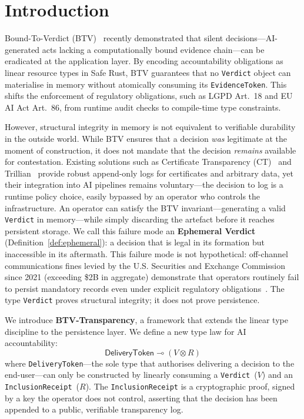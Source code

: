 \section{Introduction}
\label{sec:intro}

Bound-To-Verdict (BTV)~\cite{btv2026} recently demonstrated that silent
decisions---AI-generated acts lacking a computationally bound evidence
chain---can be eradicated at the application layer. By encoding accountability
obligations as linear resource types in Safe Rust, BTV guarantees that no
\texttt{Verdict} object can materialise in memory without atomically consuming
its \texttt{EvidenceToken}. This shifts the enforcement of regulatory
obligations, such as LGPD Art.~18 and EU AI Act Art.~86, from runtime audit
checks to compile-time type constraints.

However, structural integrity in memory is not equivalent to verifiable
durability in the outside world. While BTV ensures that a decision \emph{was}
legitimate at the moment of construction, it does not mandate that the decision
\emph{remains} available for contestation. Existing solutions such as
Certificate Transparency (CT)~\cite{rfc6962} and Trillian~\cite{trillian}
provide robust append-only logs for certificates and arbitrary data, yet their
integration into AI pipelines remains voluntary---the decision to log is a
runtime policy choice, easily bypassed by an operator who controls the
infrastructure. An operator can satisfy the BTV invariant---generating a valid
\texttt{Verdict} in memory---while simply discarding the artefact before it
reaches persistent storage. We call this failure mode an \textbf{Ephemeral
Verdict} (Definition~\ref{def:ephemeral}): a decision that is legal in its
formation but inaccessible in its aftermath. This failure mode is not
hypothetical: off-channel communications fines levied by the U.S. Securities
and Exchange Commission since 2021 (exceeding \$2B in aggregate) demonstrate
that operators routinely fail to persist mandatory records even under explicit
regulatory obligations~\cite{sec-fines-2024}. The type \texttt{Verdict} proves
structural integrity; it does not prove persistence.

We introduce \textbf{BTV-Transparency}, a framework that extends the linear
type discipline to the persistence layer. We define a new type law for AI
accountability:
\begin{equation}
  \mathsf{DeliveryToken} \multimap (V \otimes R)
  \label{eq:delivery-law}
\end{equation}
where \texttt{DeliveryToken}---the sole type that authorises delivering a
decision to the end-user---can only be constructed by linearly consuming a
\texttt{Verdict}~($V$) and an \texttt{InclusionReceipt}~($R$). The
\texttt{InclusionReceipt} is a cryptographic proof, signed by a key the
operator does not control, asserting that the decision has been appended to a
public, verifiable transparency log.

